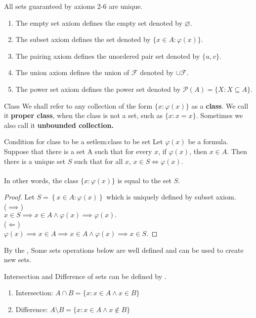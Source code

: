 \begin{remarks}
    All sets guaranteed by axioms 2-6 are unique.
    \begin{enumerate}
        \item The empty set axiom defines the empty set denoted by $\varnothing$.
        \item The subset axiom defines the set denoted by $\{x \in A:\varphi(x)\}$.
        \item The pairing axiom defines the unordered pair set denoted by $\{u, v\}$.
        \item The union axiom defines the union of $\mathcal{F}$ denoted by $\cup \mathcal{F}$.
        \item The power set axiom defines the power set denoted by $\mathcal{P}(A) = \{X:X \subseteq A\}.$
    \end{enumerate}
\end{remarks}

\begin{definition}{Class}{}
    We shall refer to any collection of the form $\{x:\varphi(x)\}$ as a \textbf{class}. We call it \textbf{proper class}, 
    when the class is not a set, such as $\{x:x=x\}$. Sometimes we also call it \textbf{unbounded collection.}
\end{definition}

\begin{lemma}{Condition for class to be a set}{lem:class to be set}
    Let $\varphi(x)$ be a formula. Suppose that there is a set A such that for every $x$, if $\varphi(x)$, then $x \in A$. Then there is a unique set $S$ such that for all $x$, $x \in S \iff \varphi(x)$.\\
    \\
    In other words, the class $\{x:\varphi(x)\}$ is equal to the set $S$.
\end{lemma}

\begin{proof}
    Let $S = \left\{x \in A \colon \varphi(x) \right\}$ which is uniquely defined by subset axiom.\\
    ($ \implies $)\\
    $x \in S \implies x \in A \land \varphi(x) \implies \varphi(x).$\\
    ($ \Leftarrow $)\\
    $\varphi(x) \implies x \in A \implies x \in A \land \varphi(x) \implies x \in S.$
\end{proof}

By the , Some sets operations below are well defined and can be used to create new sets.

\begin{corollary}{}{}
    Intersection and Difference of sets can be defined by .
    \begin{enumerate}
        \item Intersection: $A \cap B = \{x:x \in A \land x \in B\}$
        \item Difference: $A \setminus B = \{x:x \in A \land x \notin B\}$
    \end{enumerate}
\end{corollary}

